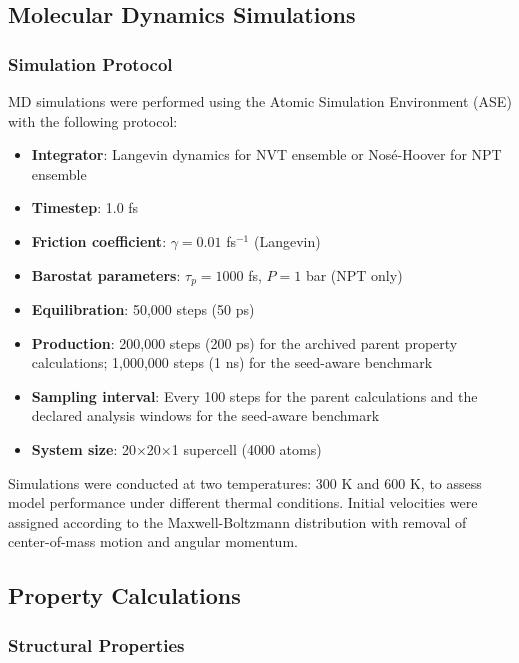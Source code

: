 \documentclass[pdflatex,sn-mathphys-num]{sn-jnl}%
\theoremstyle{thmstyleone}%
\theoremstyle{thmstyletwo}%
\theoremstyle{thmstylethree}%
\begin{document}
\subsection{Molecular Dynamics Simulations}


\subsubsection{Simulation Protocol}

MD simulations were performed using the Atomic Simulation Environment (ASE) with the following protocol:

\begin{itemize}
    \item \textbf{Integrator}: Langevin dynamics for NVT ensemble or Nosé-Hoover for NPT ensemble
    \item \textbf{Timestep}: 1.0 fs
    \item \textbf{Friction coefficient}: $\gamma = 0.01$ fs$^{-1}$ (Langevin)
    \item \textbf{Barostat parameters}: $\tau_p = 1000$ fs, $P = 1$ bar (NPT only)
    \item \textbf{Equilibration}: 50,000 steps (50 ps)
    \item \textbf{Production}: 200,000 steps (200 ps) for the archived parent property calculations; 1,000,000 steps (1 ns) for the seed-aware benchmark
    \item \textbf{Sampling interval}: Every 100 steps for the parent calculations and the declared analysis windows for the seed-aware benchmark
    \item \textbf{System size}: 20$\times$20$\times$1 supercell (4000 atoms)
\end{itemize}

Simulations were conducted at two temperatures: 300 K and 600 K, to assess model performance under different thermal conditions. Initial velocities were assigned according to the Maxwell-Boltzmann distribution with removal of center-of-mass motion and angular momentum.

\subsection{Property Calculations}

\subsubsection{Structural Properties}
\end{document}
